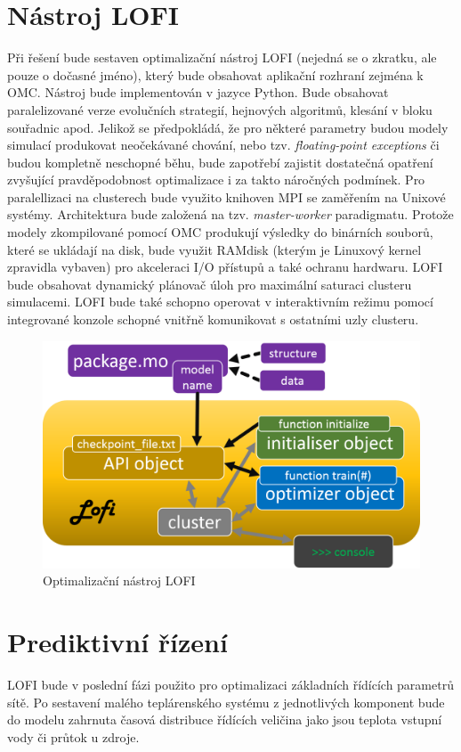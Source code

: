\section{Nástroj LOFI}
\label{sec:tool_LOFI}
Při řešení bude sestaven optimalizační nástroj LOFI (nejedná se o zkratku, ale
pouze o dočasné jméno), který bude obsahovat aplikační rozhraní zejména k OMC.
Nástroj bude implementován v jazyce Python. Bude obsahovat paralelizované verze
evolučních strategií, hejnových algoritmů, klesání v bloku souřadnic apod.
Jelikož se předpokládá, že pro některé parametry budou modely simulací
produkovat neočekávané chování, nebo tzv. \textit{floating-point exceptions} či
budou kompletně neschopné běhu, bude zapotřebí zajistit dostatečná opatření
zvyšující pravděpodobnost optimalizace i za takto náročných podmínek. Pro
paralellizaci na clusterech bude využito knihoven MPI se zaměřením na Unixové
systémy. Architektura bude založená na tzv. \textit{master-worker} paradigmatu.
Protože modely zkompilované pomocí OMC produkují výsledky do binárních souborů,
které se ukládají na disk, bude využit RAMdisk (kterým je Linuxový kernel
zpravidla vybaven) pro akceleraci I/O přístupů a také ochranu hardwaru. LOFI
bude obsahovat dynamický plánovač úloh pro maximální saturaci clusteru
simulacemi. LOFI bude také schopno operovat v interaktivním režimu pomocí
integrované konzole schopné vnitřně komunikovat s ostatními uzly clusteru.
\begin{figure}[h]
\begin{center}
  \includegraphics[scale=0.5]{figures/LofiArchitecture}
\end{center}
\caption{Optimalizační nástroj LOFI}
\label{fig:LOFI}
\end{figure}

\section{Prediktivní řízení}
\label{sec:MPC}
LOFI bude v poslední fázi použito pro optimalizaci základních řídících
parametrů sítě. Po sestavení malého teplárenského systému z jednotlivých
komponent bude do modelu zahrnuta časová distribuce řídících veličina jako jsou
teplota vstupní vody či průtok u zdroje.
